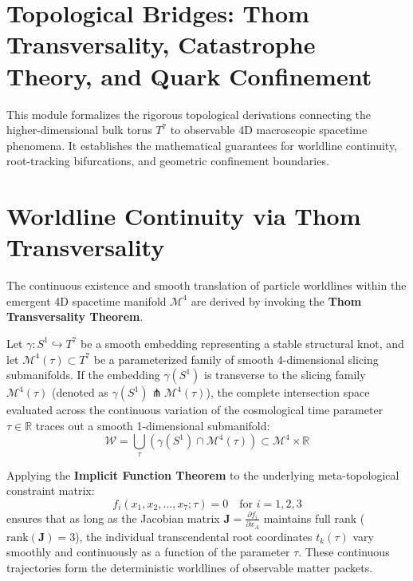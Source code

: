 \documentclass[12pt,letterpaper]{article}
\theoremstyle{definition}
\begin{document}
\section*{Topological Bridges: Thom Transversality, Catastrophe Theory, and Quark Confinement}

This module formalizes the rigorous topological derivations connecting the higher-dimensional bulk torus $T^7$ to observable 4D macroscopic spacetime phenomena. It establishes the mathematical guarantees for worldline continuity, root-tracking bifurcations, and geometric confinement boundaries.

\section{Worldline Continuity via Thom Transversality}
The continuous existence and smooth translation of particle worldlines within the emergent 4D spacetime manifold $\mathcal{M}^4$ are derived by invoking the \textbf{Thom Transversality Theorem}. 

Let $\gamma: S^1 \hookrightarrow T^7$ be a smooth embedding representing a stable structural knot, and let $\mathcal{M}^4(\tau) \subset T^7$ be a parameterized family of smooth 4-dimensional slicing submanifolds. If the embedding $\gamma(S^1)$ is transverse to the slicing family $\mathcal{M}^4(\tau)$ (denoted as $\gamma(S^1) \pitchfork \mathcal{M}^4(\tau)$), the complete intersection space evaluated across the continuous variation of the cosmological time parameter $\tau \in \mathbb{R}$ traces out a smooth 1-dimensional submanifold:
\begin{equation}
    \mathcal{W} = \bigcup_{\tau} \left( \gamma(S^1) \cap \mathcal{M}^4(\tau) \right) \subset \mathcal{M}^4 \times \mathbb{R}
\end{equation}

Applying the \textbf{Implicit Function Theorem} to the underlying meta-topological constraint matrix:
\begin{equation}
    f_i(x_1, x_2, \dots, x_7; \tau) = 0 \quad \text{for } i = 1, 2, 3
\end{equation}
ensures that as long as the Jacobian matrix $\mathbf{J} = \frac{\partial f_i}{\partial x_A}$ maintains full rank ($\text{rank}(\mathbf{J}) = 3$), the individual transcendental root coordinates $t_k(\tau)$ vary smoothly and continuously as a function of the parameter $\tau$. These continuous trajectories form the deterministic worldlines of observable matter packets.
\end{document}
